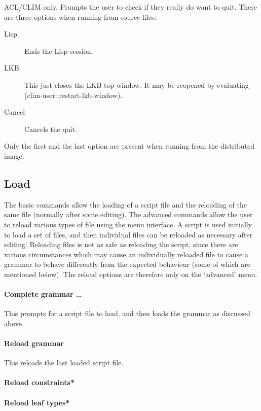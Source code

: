 \documentclass[12pt]{report}
\begin{document}
ACL/CLIM only.  Prompts the user to check if they really do want to
quit.  There are three options when running from source files:
\begin{description}
\item[Lisp] Ends the Lisp session.
\item[LKB] This just closes the LKB top window.  It may be reopened by
evaluating (clim-user::restart-lkb-window).
\item[Cancel] Cancels the quit.
\end{description}
Only the first and the last option are present when running from the distributed
image.

\subsection{Load}
\label{load}

The basic commands allow the loading of a script file
and the reloading of the same file (normally after some editing).
The advanced 
commands allow the user to reload various types of file using the
menu interface.   
A script
is used initially to load a set of files, and then individual files
can be reloaded as necessary after editing.
Reloading files is not as safe as reloading the script, since there
are various circumstances which may cause an individually reloaded
file to cause a grammar to behave differently from the expected behaviour
(some of which are mentioned below).
The reload options are therefore only on the `advanced' menu.

\paragraph{Complete grammar \ldots}

This prompts for a script file to load, and then loads the 
grammar as discussed above.

\paragraph{Reload grammar}

This reloads the last loaded script file.

\paragraph{Reload constraints*}

\paragraph{Reload leaf types*}
\end{document}

